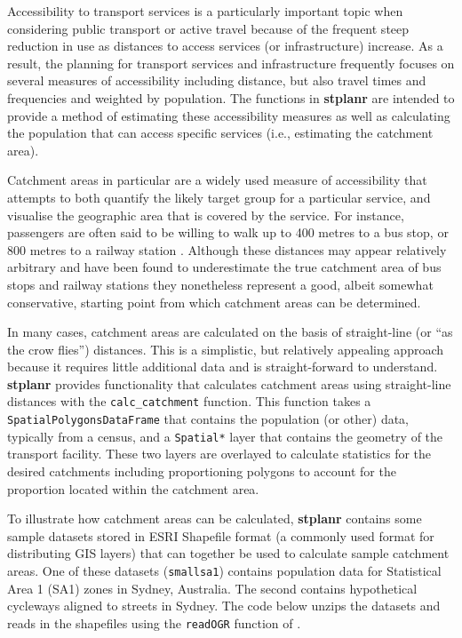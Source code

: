 Accessibility to transport services is a particularly important topic
when considering public transport or active travel because of the
frequent steep reduction in use as distances to access services (or
infrastructure) increase. As a result, the planning for transport
services and infrastructure frequently focuses on several measures of
accessibility including distance, but also travel times and frequencies
and weighted by population. The functions in \textbf{stplanr} are
intended to provide a method of estimating these accessibility measures
as well as calculating the population that can access specific services
(i.e., estimating the catchment area).

Catchment areas in particular are a widely used measure of accessibility
that attempts to both quantify the likely target group for a particular
service, and visualise the geographic area that is covered by the
service. For instance, passengers are often said to be willing to walk
up to 400 metres to a bus stop, or 800 metres to a railway station
\citep{el-geneidy_new_2014}. Although these distances may appear
relatively arbitrary and have been found to underestimate the true
catchment area of bus stops and railway stations
\citep{el-geneidy_new_2014,daniels_explaining_2013} they nonetheless
represent a good, albeit somewhat conservative, starting point from
which catchment areas can be determined.

In many cases, catchment areas are calculated on the basis of
straight-line (or ``as the crow flies'') distances. This is a
simplistic, but relatively appealing approach because it requires little
additional data and is straight-forward to understand. \textbf{stplanr}
provides functionality that calculates catchment areas using
straight-line distances with the \texttt{calc\_catchment} function. This
function takes a \texttt{SpatialPolygonsDataFrame} that contains the
population (or other) data, typically from a census, and a
\texttt{Spatial*} layer that contains the geometry of the transport
facility. These two layers are overlayed to calculate statistics for the
desired catchments including proportioning polygons to account for the
proportion located within the catchment area.

To illustrate how catchment areas can be calculated, \textbf{stplanr}
contains some sample datasets stored in ESRI Shapefile format (a
commonly used format for distributing GIS layers) that can together be
used to calculate sample catchment areas. One of these datasets
(\texttt{smallsa1}) contains population data for Statistical Area 1
(SA1) zones in Sydney, Australia. The second contains hypothetical
cycleways aligned to streets in Sydney. The code below unzips the
datasets and reads in the shapefiles using the \texttt{readOGR} function
of .

